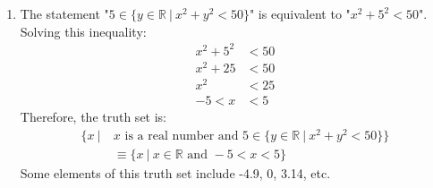 \begin{enumerate}[label=(\alph*)]
    \item The statement "$5 \in \{y \in \mathbb{R} \ | \ x^2+y^2 < 50 \}$" is equivalent to "$x^2+5^2 < 50$". Solving this inequality:
    \begin{align*}
        x^2+5^2 &< 50 \\
        x^2+25 &< 50 \\
        x^2 &< 25 \\
        -5 < x &< 5
    \end{align*}
    Therefore, the truth set is:
    \begin{align*}
        \{ x \ | \ &x \text{ is a real number and } 5 \in \{y \in \mathbb{R} \ | \ x^2+y^2 < 50 \} \} \\
        &\equiv \{ x \ | \ x \in \mathbb{R} \text{ and } -5 < x < 5 \}
    \end{align*}
    Some elements of this truth set include -4.9, 0, 3.14, etc.
\end{enumerate}